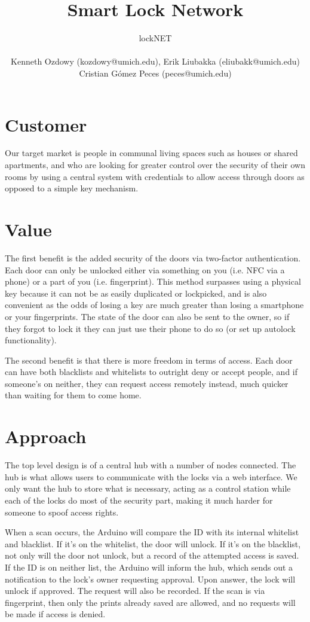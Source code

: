 \documentclass{article}
\title{Smart Lock Network}
\author{
  lockNET \\ \\
  Kenneth Ozdowy (kozdowy@umich.edu), Erik Liubakka (eliubakk@umich.edu) \\
  Cristian G\'{o}mez Peces (peces@umich.edu)
}
\date{}
\begin{document}
\maketitle

\section{Customer}
Our target market is people in communal living spaces such as houses or shared
apartments, and who are looking for greater control over the security of their
own rooms by using a central system with credentials to allow access through
doors as opposed to a simple key mechanism.

\section{Value}

The first benefit is the added security of the doors via two-factor
authentication. Each door can only be unlocked either via something on you (i.e.
NFC via a phone) or a part of you (i.e. fingerprint). This method
surpasses using a physical key because it can not be as easily duplicated or
lockpicked, and is also convenient as the odds of losing a key are much greater
than losing a smartphone or your fingerprints. The state of the door can also be
sent to the owner, so if they forgot to lock it they can just use their phone to
do so (or set up autolock functionality).

The second benefit is that there is more freedom in terms of access. Each door
can have both blacklists and whitelists to outright deny or accept people, and
if someone's on neither, they can request access remotely instead, much quicker
than waiting for them to come home. 

\section{Approach}

The top level design is of a central hub with a number of nodes connected. The
hub is what allows users to communicate with the locks via a web interface. We
only want the hub to store what is necessary, acting as a control station while
each of the locks do most of the security part, making it much harder for
someone to spoof access rights.

When a scan occurs, the Arduino will compare the ID with its internal whitelist
and blacklist. If it's on the whitelist, the door will unlock. If it's on the
blacklist, not only will the door not unlock, but a record of the attempted
access is saved. If the ID is on neither list, the Arduino will inform the hub,
which sends out a notification to the lock's owner requesting approval. Upon
answer, the lock will unlock if approved. The request will also be recorded. If
the scan is via fingerprint, then only the prints already saved are allowed, and
no requests will be made if access is denied.
\end{document}
